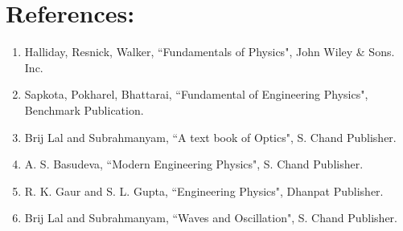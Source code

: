 \section*{References:}
\begin{enumerate}
    \item Halliday, Resnick, Walker, ``Fundamentals of Physics", John Wiley \& Sons. Inc.
    \item Sapkota, Pokharel, Bhattarai, ``Fundamental of Engineering Physics", Benchmark Publication.
    \item Brij Lal and Subrahmanyam, ``A text book of Optics", S. Chand Publisher.
    \item A. S. Basudeva, ``Modern Engineering Physics", S. Chand Publisher.
    \item R. K. Gaur and S. L. Gupta, ``Engineering Physics", Dhanpat Publisher.
    \item Brij Lal and Subrahmanyam, ``Waves and Oscillation", S. Chand Publisher.
\end{enumerate}